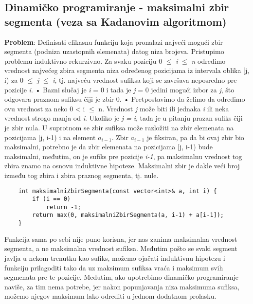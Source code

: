 \documentclass{article}
\begin{document}
\subsection{Dinamičko programiranje - maksimalni zbir segmenta (veza sa Kadanovim algoritmom)}
\textbf{Problem}: Definisati efikasnu funkciju koja pronalazi najveći mogući zbir segmenta (podniza uzastopnih elemenata) datog niza brojeva.
\newline
Pristupimo problemu induktivno-rekurzivno. Za svaku poziciju 0 $\leq$  \textit{i} $\leq$ \textit{n} odredimo vrednost najvećeg zbira segmenta niza određenog pozicijama iz intervala
oblika [j, i) za 0 $\leq$ \textit{j} $\leq$ \textit{i}, tj. najveću vrednost sufiksa koji se završava neposredno pre pozicije \textit{i}.
\newline \hspace*{0.4cm}• Bazni slučaj je \textit{i} = 0 i tada je \textit{j} = 0 jedini mogući izbor za \textit{j}, što odgovara
praznom sufiksu čiji je zbir 0.
\newline \hspace*{0.4cm}• Pretpostavimo da želimo da odredimo ovu vrednost za neko 0 < i $\leq$ n.
Vrednost \textit{j} može biti ili jednaka \textit{i} ili neka vrednost strogo manja od \textit{i}.
Ukoliko je\textit{ j = i}, tada je u pitanju prazan sufiks čiji je zbir nula. U
suprotnom se zbir sufiksa može razložiti na zbir elemenata na pozicijama
[j, i-1) i na element $a_{i-1}$. Zbir $a_{i-1}$ je fiksiran, pa da bi ovaj zbir bio
maksimalni, potrebno je da zbir elemenata na pozicijama [j, i-1) bude
maksimalni, međutim, on je sufiks pre pozicije \textit{i-1}, pa maksimalnu
vrednost tog zbira znamo na osnovu induktivne hipoteze. Maksimalni zbir
je dakle veći broj između tog zbira i zbira praznog segmenta, tj. nule.
\begin{lstlisting}
    int maksimalniZbirSegmenta(const vector<int>& a, int i) {
        if (i == 0)
            return -1;
        return max(0, maksimalniZbirSegmenta(a, i-1) + a[i-1]);
    }
\end{lstlisting}
Funkcija sama po sebi nije puno korisna, jer nas zanima maksimalna vrednost
segmenta, a ne maksimalna vrednost sufiksa. Međutim pošto se svaki segment
javlja u nekom trenutku kao sufiks, možemo ojačati induktivnu hipotezu i funkciju
prilagoditi tako da uz maksimum sufiksa vraća i maksimum svih segmenata pre
te pozicije. Međutim, ako upotrebimo dinamičko programiranje naviše, za tim
nema potrebe, jer nakon popunjavanja niza maksimuma sufiksa, možemo njegov
maksimum lako odrediti u jednom dodatnom prolasku.
\end{document}
